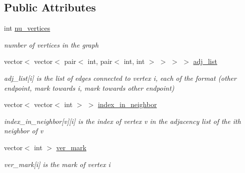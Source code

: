\subsection*{Public Attributes}
\begin{DoxyCompactItemize}
\item 
int \hyperlink{classmarked__graph_acf79c6aeb8f32614cb14a5baaa6c9f9b}{nu\+\_\+vertices}
\begin{DoxyCompactList}\small\item\em number of vertices in the graph \end{DoxyCompactList}\item 
vector$<$ vector$<$ pair$<$ int, pair$<$ int, int $>$ $>$ $>$ $>$ \hyperlink{classmarked__graph_a1a0bf7ca413a278763f7c878b3b6fd6f}{adj\+\_\+list}
\begin{DoxyCompactList}\small\item\em adj\+\_\+list\mbox{[}i\mbox{]} is the list of edges connected to vertex i, each of the format (other endpoint, mark towards i, mark towards other endpoint) \end{DoxyCompactList}\item 
vector$<$ vector$<$ int $>$ $>$ \hyperlink{classmarked__graph_aee10b537408de42476609c1e45c075d0}{index\+\_\+in\+\_\+neighbor}
\begin{DoxyCompactList}\small\item\em index\+\_\+in\+\_\+neighbor\mbox{[}v\mbox{]}\mbox{[}i\mbox{]} is the index of vertex v in the adjacency list of the ith neighbor of v \end{DoxyCompactList}\item 
vector$<$ int $>$ \hyperlink{classmarked__graph_ac83e9377dd4d8bb95be1ac949b127296}{ver\+\_\+mark}
\begin{DoxyCompactList}\small\item\em ver\+\_\+mark\mbox{[}i\mbox{]} is the mark of vertex i \end{DoxyCompactList}\end{DoxyCompactItemize}
